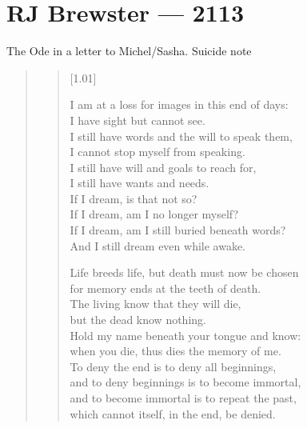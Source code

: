 \chapter*{RJ Brewster — 2113}

The Ode in a letter to Michel/Sasha. Suicide note

\begin{quote}

  \begin{verse}[1.01\textwidth]

    I am at a loss for images in this end of days:\\
    I have sight but cannot see.\\
    I still have words and the will to speak them,\\
    I cannot stop myself from speaking.\\
    I still have will and goals to reach for,\\
    I still have wants and needs.\\
    If I dream, is that not so?\\
    If I dream, am I no longer myself?\\
    If I dream, am I still buried beneath words?\\
    And I still dream even while awake.

    Life breeds life, but death must now be chosen\\
    for memory ends at the teeth of death.\\
    The living know that they will die,\\
    but the dead know nothing.\\
    Hold my name beneath your tongue and know:\\
    when you die, thus dies the memory of me.\\
    To deny the end is to deny all beginnings,\\
    and to deny beginnings is to become immortal,\\
    and to become immortal is to repeat the past,\\
    which cannot itself, in the end, be denied.







\end{verse}
\end{quote}
